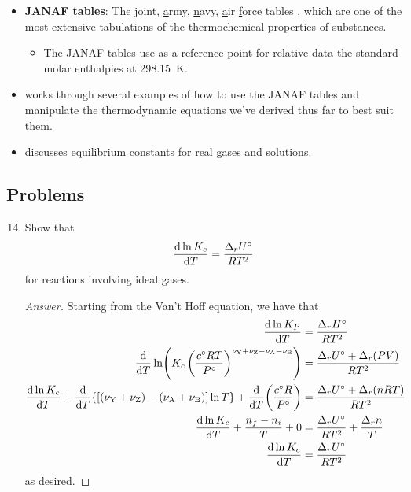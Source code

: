 \documentclass[../notes.tex]{subfiles}
\begin{document}
\begin{itemize}
    \item \textbf{JANAF tables}: The \underline{j}oint, \underline{a}rmy, \underline{n}avy, \underline{a}ir \underline{f}orce tables \parencite{bib:JANAFtables}, which are one of the most extensive tabulations of the thermochemical properties of substances.
    \begin{itemize}
        \item The JANAF tables use as a reference point for relative data the standard molar enthalpies at \SI{298.15}{\kelvin}.
    \end{itemize}
    \item \textcite{bib:McQuarrieSimon} works through several examples of how to use the JANAF tables and manipulate the thermodynamic equations we've derived thus far to best suit them.
    \item \textcite{bib:McQuarrieSimon} discusses equilibrium constants for real gases and solutions.
\end{itemize}


\subsection*{Problems}
\begin{enumerate}[label={\textbf{26-\arabic*.}},ref={26-\arabic*},leftmargin=3.5em]
    \setcounter{enumi}{13}
    \item \label{prb:26-14}Show that
    \begin{equation*}
        \dv{\ln K_c}{T} = \frac{\Delta_rU^\circ}{RT^2}
    \end{equation*}
    for reactions involving ideal gases.
    \begin{proof}[Answer]
        Starting from the Van't Hoff equation, we have that
        \begin{align*}
            \dv{\ln K_P}{T} &= \frac{\Delta_rH^\circ}{RT^2}\\
            \dv{T}\ln(K_c\left( \frac{c^\circ RT}{P^\circ} \right)^{\nu_{\ce{Y}}+\nu_{\ce{Z}}-\nu_{\ce{A}}-\nu_{\ce{B}}}) &= \frac{\Delta_rU^\circ+\Delta_r(PV)}{RT^2}\\
            \dv{\ln K_c}{T}+\dv{T}\{[(\nu_{\ce{Y}}+\nu_{\ce{Z}})-(\nu_{\ce{A}}+\nu_{\ce{B}})]\ln T\}+\dv{T}(\frac{c^\circ R}{P^\circ}) &= \frac{\Delta_rU^\circ+\Delta_r(nRT)}{RT^2}\\
            \dv{\ln K_c}{T}+\frac{n_f-n_i}{T}+0 &= \frac{\Delta_rU^\circ}{RT^2}+\frac{\Delta_rn}{T}\\
            \dv{\ln K_c}{T} &= \frac{\Delta_rU^\circ}{RT^2}
        \end{align*}
        as desired.
    \end{proof}
\end{enumerate}
\end{document}
